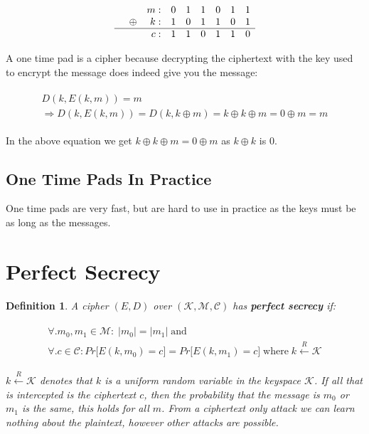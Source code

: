 \documentclass[11pt,a4paper]{report}
\newtheorem{definition}{Definition}
\begin{document}
\[ \begin{array}{*9r}
    &		&m: &0 &1 &1 &0 &1 &1 \\
    &\oplus	&k:	&1 &0 &1 &1 &0 &1 \\ \hline
    &		&c:	&1 &1 &0 &1 &1 &0 \\ 
   \end{array} \]


A one time pad is a cipher because decrypting the ciphertext with the key used to encrypt the message does indeed give you the message:

\begin{gather}
	\begin{gathered}
		D(k, E(k, m)) = m \\
		\Rightarrow D(k, E(k, m)) = D(k, k \oplus m) = k \oplus k \oplus m = 0 \oplus m =m
	\end{gathered}
\end{gather}

In the above equation we get $k \oplus k \oplus m = 0 \oplus m$ as $k \oplus k$ is $0$. 

\subsection{One Time Pads In Practice}
One time pads are very fast, but are hard to use in practice as the keys must be as long as the messages.


\section{Perfect Secrecy}
\begin{definition}
A cipher $(E,D)$ over $(\mathscr{K},\mathscr{M},\mathscr{C})$ has \textbf{perfect secrecy} if:

\begin{gather}
\begin{gathered}
	\forall. m_0, m_1 \in \mathscr{M} : \; \big\lvert m_0 \big\rvert = \big\lvert m_1 \big\rvert \; \textrm{and} \\
	\forall. c \in \mathscr{C} : Pr \big\lbrack E(k, m_0) = c \big\rbrack = Pr \big\lbrack E(k, m_1) = c \big\rbrack 
	\; \textrm{where} \; k \xleftarrow{R} \mathscr{K}
\end{gathered}
\end{gather}


$k \xleftarrow{R} \mathscr{K}$ denotes that $k$ is a \emph{uniform random variable} in the keyspace $\mathscr{K}$. If all that is intercepted is the ciphertext $c$, then the probability that the message is $m_0$ or $m_1$ is the same, this holds for all $m$. From a ciphertext only attack we can learn nothing about the plaintext, however other attacks are possible.
\end{definition}
\end{document}
